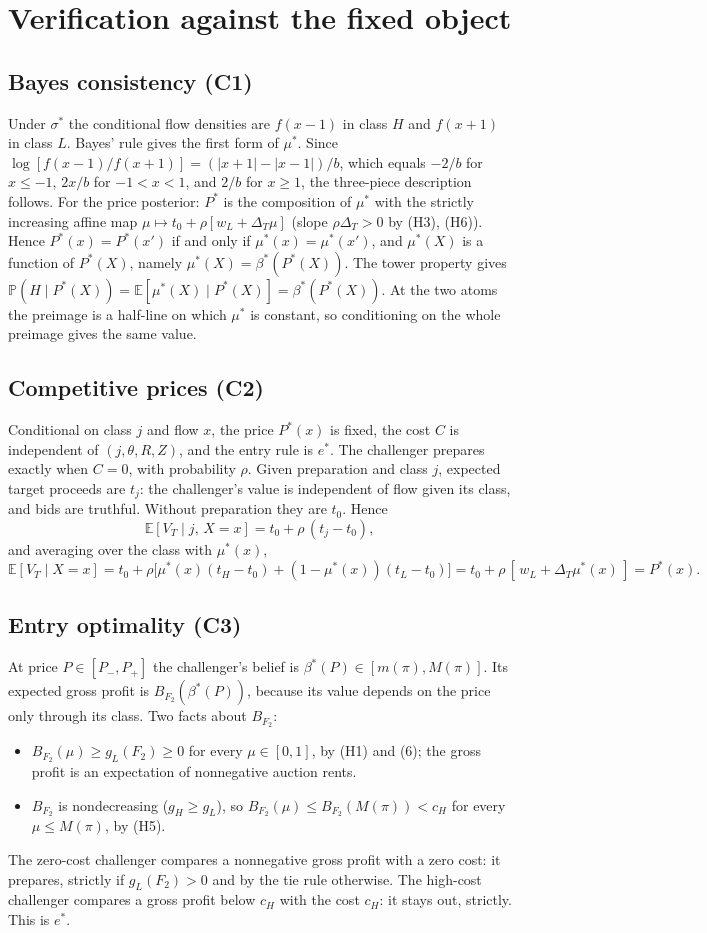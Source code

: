 \documentclass[12pt]{article}
\theoremstyle{remark}
\newcommand{\E}{\mathbb E}
\renewcommand{\Pr}{\mathbb P}
\newcommand{\Dt}{\Delta_T}
\begin{document}
\section{Verification against the fixed object}

\subsection{Bayes consistency (C1)}
Under $\sigma^*$ the conditional flow densities are $f(x-1)$ in class $H$ and $f(x+1)$ in
class $L$. Bayes' rule gives the first form of $\mu^*$. Since
$\log[f(x-1)/f(x+1)]=(|x+1|-|x-1|)/b$, which equals $-2/b$ for $x\le-1$, $2x/b$ for
$-1<x<1$, and $2/b$ for $x\ge1$, the three-piece description follows. For the price
posterior: $P^*$ is the composition of $\mu^*$ with the strictly increasing affine map
$\mu\mapsto t_0+\rho[w_L+\Dt\mu]$ (slope $\rho\Dt>0$ by (H3), (H6)). Hence
$P^*(x)=P^*(x')$ if and only if $\mu^*(x)=\mu^*(x')$, and $\mu^*(X)$ is a function of
$P^*(X)$, namely $\mu^*(X)=\beta^*(P^*(X))$. The tower property gives
$\Pr(H\mid P^*(X))=\E[\mu^*(X)\mid P^*(X)]=\beta^*(P^*(X))$. At the two atoms the preimage
is a half-line on which $\mu^*$ is constant, so conditioning on the whole preimage gives the
same value.

\subsection{Competitive prices (C2)}
Conditional on class $j$ and flow $x$, the price $P^*(x)$ is fixed, the cost $C$ is independent
of $(j,\theta,R,Z)$, and the entry rule is $e^*$. The challenger prepares exactly when $C=0$,
with probability $\rho$. Given preparation and class $j$, expected target proceeds are $t_j$: the
challenger's value is independent of flow given its class, and bids are truthful. Without
preparation they are $t_0$. Hence
\[
\E[V_T\mid j,\,X=x]=t_0+\rho\,(t_j-t_0),
\]
and averaging over the class with $\mu^*(x)$,
\[
\E[V_T\mid X=x]=t_0+\rho\big[\mu^*(x)(t_H-t_0)+(1-\mu^*(x))(t_L-t_0)\big]
=t_0+\rho\,[\,w_L+\Dt\mu^*(x)\,]=P^*(x).
\]

\subsection{Entry optimality (C3)}
At price $P\in[P_-,P_+]$ the challenger's belief is $\beta^*(P)\in[m(\pi),M(\pi)]$. Its
expected gross profit is $B_{F_2}(\beta^*(P))$, because its value depends on the price only
through its class. Two facts about $B_{F_2}$:
\begin{itemize}
\item $B_{F_2}(\mu)\ge g_L(F_2)\ge0$ for every $\mu\in[0,1]$, by (H1) and (6); the gross
  profit is an expectation of nonnegative auction rents.
\item $B_{F_2}$ is nondecreasing ($g_H\ge g_L$), so $B_{F_2}(\mu)\le B_{F_2}(M(\pi))<c_H$ for
  every $\mu\le M(\pi)$, by (H5).
\end{itemize}
The zero-cost challenger compares a nonnegative gross profit with a zero cost: it prepares,
strictly if $g_L(F_2)>0$ and by the tie rule otherwise. The high-cost challenger compares a
gross profit below $c_H$ with the cost $c_H$: it stays out, strictly. This is $e^*$.
\end{document}
